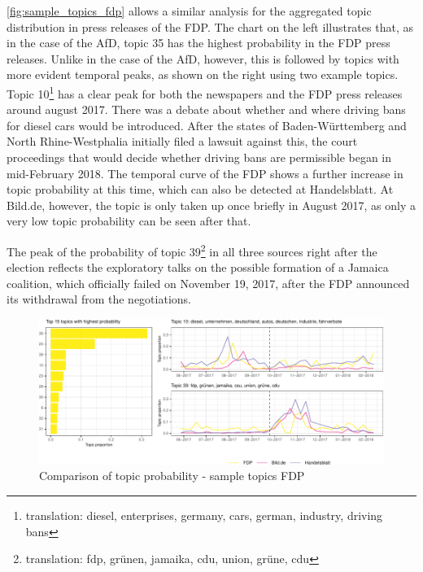 \documentclass[
]{article}
\begin{document}
\autoref{fig:sample_topics_fdp} allows a similar analysis for the
aggregated topic distribution in press releases of the FDP. The chart on
the left illustrates that, as in the case of the AfD, topic 35 has the
highest probability in the FDP press releases. Unlike in the case of the
AfD, however, this is followed by topics with more evident temporal
peaks, as shown on the right using two example topics. Topic
10\footnote{translation: diesel, enterprises, germany, cars, german,
  industry, driving bans} has a clear peak for both the newspapers and
the FDP press releases around august 2017. There was a debate about
whether and where driving bans for diesel cars would be introduced.
After the states of Baden-Württemberg and North Rhine-Westphalia
initially filed a lawsuit against this, the court proceedings that would
decide whether driving bans are permissible began in mid-February 2018.
The temporal curve of the FDP shows a further increase in topic
probability at this time, which can also be detected at Handelsblatt. At
Bild.de, however, the topic is only taken up once briefly in August
2017, as only a very low topic probability can be seen after that.

The peak of the probability of topic 39\footnote{translation: fdp,
  grünen, jamaika, cdu, union, grüne, cdu} in all three sources right
after the election reflects the exploratory talks on the possible
formation of a Jamaica coalition, which officially failed on November
19, 2017, after the FDP announced its withdrawal from the negotiations.

\begin{figure}

{\centering \includegraphics[width=1\linewidth]{main_text_files/figure-latex/Top FDP topics-1} 

}

\caption{Comparison of topic probability - sample topics FDP \label{fig:sample_topics_fdp}}\label{fig:Top FDP topics}
\end{figure}
\end{document}
